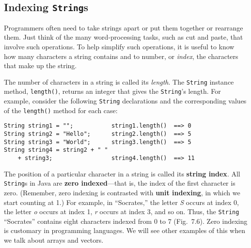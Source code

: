 \subsection{Indexing {\tt String}s }

\noindent Programmers often need to take strings apart or put them
together or rearrange them. Just think of the many word-processing
tasks, such as cut and paste, that involve such operations.  To help
simplify such operations, it is useful to know how many characters a
string contains and to number, or {\em index}, the characters that
make up the string.

The number of characters in a string is called its {\it length}.  The
{\tt String} instance method, {\tt length()}, returns an integer that
gives the {\tt String}'s length.  For example, consider the following
{\tt String} declarations and the corresponding values of the
{\tt length()} method for each case:

\begin{jjjlisting}
\begin{lstlisting}
String string1 = "";           string1.length()  ==> 0
String string2 = "Hello";      string2.length()  ==> 5
String string3 = "World";      string3.length()  ==> 5
String string4 = string2 + " " 
    + string3;                 string4.length()  ==> 11
\end{lstlisting}
\end{jjjlisting}

The position of a particular character in a string is called its {\bf
{}
string index}. All {\tt String}s in Java are {\bf zero
indexed}---that is, the index of the first
character is zero.  (Remember, zero indexing is contrasted with {\bf
unit indexing}, in which we start counting at 1.)  For example, in
``Socrates,'' the letter {\it S} occurs at index 0, the letter {\it o}
occurs at index 1, {\it r} occurs at index 3, and so on.  Thus, the
{\tt String} ``Socrates'' contains eight characters indexed from 0 to
7 (Fig.~7\mbox{.}6).  Zero indexing is customary in programming
languages.  We will see other examples of this when we talk about
arrays and vectors.


